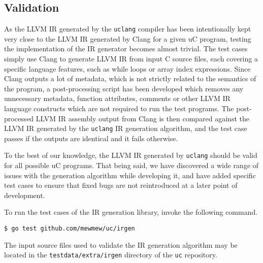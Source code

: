 \subsection{Validation}
\label{sec:irgen_validation}

As the LLVM IR generated by the \texttt{uclang} compiler has been intentionally kept very close to the LLVM IR generated by Clang for a given uC program, testing the implementation of the IR generator becomes almost trivial. The test cases simply use Clang to generate LLVM IR from input C source files, each covering a specific language features, such as while loops or array index expressions. Since Clang outputs a lot of metadata, which is not strictly related to the semantics of the program, a post-processing script has been developed which removes any unnecessary metadata, function attributes, comments or other LLVM IR language constructs which are not required to run the test programs. The post-processed LLVM IR assembly output from Clang is then compared against the LLVM IR generated by the \texttt{uclang} IR generation algorithm, and the test case passes if the outputs are identical and it fails otherwise.

To the best of our knowledge, the LLVM IR generated by \texttt{uclang} should be valid for all possible uC programs. That being said, we have discovered a wide range of issues with the generation algorithm while developing it, and have added specific test cases to ensure that fixed bugs are not reintroduced at a later point of development.

To run the test cases of the IR generation library, invoke the following command.

\begin{verbatim}
$ go test github.com/mewmew/uc/irgen
\end{verbatim}

The input source files used to validate the IR generation algorithm may be located in the \texttt{testdata/extra/irgen} directory of the \texttt{uc} repository.


%


%
%
